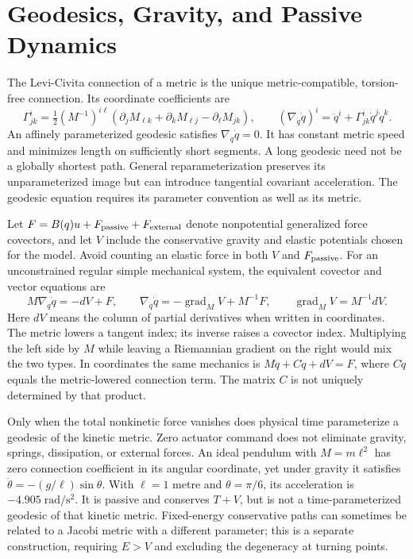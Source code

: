 \section{Geodesics, Gravity, and Passive Dynamics}

The Levi-Civita connection of a metric is the unique metric-compatible,
torsion-free connection. Its coordinate coefficients are
\begin{equation}\label{eq:manifold_christoffel}
 \Gamma^i_{jk}=\tfrac12(M^{-1})^{i\ell}
 (\partial_jM_{\ell k}+\partial_kM_{\ell j}-\partial_\ell M_{jk}),
 \qquad
 (\nabla_{\dot q}\dot q)^i=\ddot q^i+\Gamma^i_{jk}\dot q^j\dot q^k.
\end{equation}
An affinely parameterized geodesic satisfies $\nabla_{\dot q}\dot q=0$.
It has constant metric speed and minimizes length on sufficiently short
segments. A long geodesic need not be a globally shortest path. General
reparameterization preserves its unparameterized image but can introduce
tangential covariant acceleration. The geodesic equation requires its
parameter convention as well as its metric.

Let $F=B(q)u+F_{\rm passive}+F_{\rm external}$ denote nonpotential generalized
force covectors, and let $V$ include the conservative gravity and elastic
potentials chosen for the model. Avoid counting an elastic force in both
$V$ and $F_{\rm passive}$. For an unconstrained regular simple mechanical
system, the equivalent covector and vector equations are
\begin{equation}\label{eq:euler_lagrange_manifold}
 M\nabla_{\dot q}\dot q=-dV+F,\qquad
 \nabla_{\dot q}\dot q=-\operatorname{grad}_M V+M^{-1}F,
 \qquad \operatorname{grad}_M V=M^{-1}dV.
\end{equation}
Here $dV$ means the column of partial derivatives when written in coordinates.
The metric lowers a tangent index; its inverse raises a covector index.
Multiplying the left side by $M$ while leaving a Riemannian gradient on the
right would mix the two types. In coordinates the same mechanics is
$M\ddot q+C\dot q+dV=F$, where $C\dot q$ equals the metric-lowered connection
term. The matrix $C$ is not uniquely determined by that product.

Only when the total nonkinetic force vanishes does physical time parameterize
a geodesic of the kinetic metric. Zero actuator command does not eliminate
gravity, springs, dissipation, or external forces. An ideal pendulum with
$M=m\ell^2$ has zero connection coefficient in its angular coordinate, yet
under gravity it satisfies $\ddot\theta=-(g/\ell)\sin\theta$. With $\ell=1$
metre and $\theta=\pi/6$, its acceleration is $-4.905\;\mathrm{rad/s^2}$.
It is passive and conserves $T+V$, but is not a time-parameterized geodesic
of that kinetic metric. Fixed-energy conservative paths can sometimes be
related to a Jacobi metric with a different parameter; this is a separate
construction, requiring $E>V$ and excluding the degeneracy at turning points.

